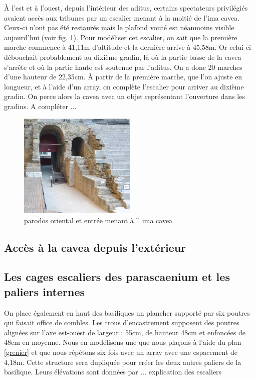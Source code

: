 \`A l'est et à l'ouest, depuis l'intérieur des  \gls{aditus}, certains spectateurs privilégiés avaient accès aux tribunes par un escalier menant à la moitié de l'\gls{ima cavea}. Ceux-ci n'ont pas été restaurés mais le plafond vouté est néanmoins visible aujourd'hui (voir fig. \ref{parodos}). Pour modéliser cet escalier, on sait que la première marche commence à 41,11m d'altitude et la dernière arrive à 45,58m. Or celui-ci débouchait probablement au dixième gradin, là où la partie basse de la  \gls{cavea} s'arrête et où la partie haute est soutenue par l'\gls{aditus}. On a donc 20 marches d'une hauteur de 22,35cm. \`{A} partir de la première marche, que l'on ajuste en longueur, et à l'aide d'un \gls{array}, on complète l'escalier pour arriver au dixième gradin. On perce alors la \gls{cavea} avec un objet représentant l'ouverture dans les gradins. A compléter ...

\begin{figure}[!h]
	\centering
	\includegraphics[width=0.5\textwidth]{images/parodos}
	\caption[\Gls{parodos} oriental et entrée menant à l' \gls{ima cavea}]{\Gls{parodos} oriental et entrée menant à l' \gls{ima cavea} \footnotemark} 
	\label{parodos} 
\end{figure}

\subsection{Accès à la  \gls{cavea} depuis l'extérieur}

\subsection{Les cages escaliers des \gls{parascaenium} et les paliers internes}


On place également en haut des basiliques un plancher supporté par six poutres qui faisait office de combles. Les trous d'encastrement supposent des poutres alignées sur l'axe est-ouest de largeur : 55cm, de hauteur 48cm et enfoncées de 48cm en moyenne. Nous en modélisons une que nous plaçons à l'aide du plan \ref{grenier} et que nous répétons six fois avec un \gls{array} avec une espacement de 4,18m. Cette structure sera dupliquée pour créer les deux autres paliers de la basilique. Leurs élévations sont données par ... explication des escaliers


